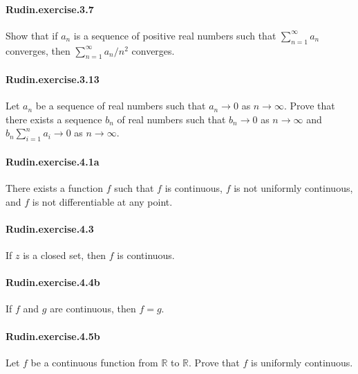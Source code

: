 \documentclass{article}
\begin{document}

\paragraph{Rudin.exercise.3.7} Show that if $a_n$ is a sequence of positive real numbers such that $\sum_{n=1}^\infty a_n$ converges, then $\sum_{n=1}^\infty a_n / n^2$ converges.

\paragraph{Rudin.exercise.3.13} Let $a_n$ be a sequence of real numbers such that $a_n \to 0$ as $n \to \infty$. Prove that there exists a sequence $b_n$ of real numbers such that $b_n \to 0$ as $n \to \infty$ and $b_n \sum_{i=1}^n a_i \to 0$ as $n \to \infty$.


\paragraph{Rudin.exercise.4.1a} There exists a function $f$ such that $f$ is continuous, $f$ is not uniformly continuous, and $f$ is not differentiable at any point.

\paragraph{Rudin.exercise.4.3} If $z$ is a closed set, then $f$ is continuous.

\paragraph{Rudin.exercise.4.4b} If $f$ and $g$ are continuous, then $f = g$.

\paragraph{Rudin.exercise.4.5b} Let $f$ be a continuous function from $\mathbb{R}$ to $\mathbb{R}$. Prove that $f$ is uniformly continuous.
\end{document}
